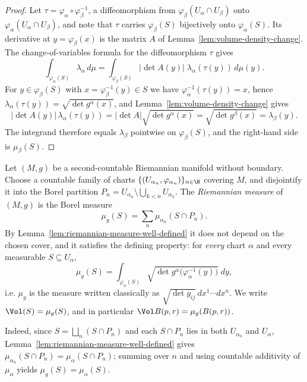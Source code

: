 \begin{proof}
\sketch
{}
\leanok
Let $\tau=\varphi_\alpha\circ\varphi_\beta^{-1}$, a diffeomorphism from
$\varphi_\beta(U_\alpha\cap U_\beta)$ onto $\varphi_\alpha(U_\alpha\cap U_\beta)$, and note
that $\tau$ carries $\varphi_\beta(S)$ bijectively onto $\varphi_\alpha(S)$. Its derivative
at $y=\varphi_\beta(x)$ is the matrix $A$ of Lemma~\ref{lem:volume-density-change}. The
change-of-variables formula for the diffeomorphism $\tau$ gives
$$\int_{\varphi_\alpha(S)}\lambda_\alpha\,d\mu
=\int_{\varphi_\beta(S)}\lvert\det A(y)\rvert\;\lambda_\alpha(\tau(y))\,d\mu(y).$$
For $y\in\varphi_\beta(S)$ with $x=\varphi_\beta^{-1}(y)\in S$ we have
$\varphi_\alpha^{-1}(\tau(y))=x$, hence
$\lambda_\alpha(\tau(y))=\sqrt{\det g^\alpha(x)}$, and Lemma~\ref{lem:volume-density-change}
gives
$$\lvert\det A(y)\rvert\,\lambda_\alpha(\tau(y))
=\lvert\det A\rvert\sqrt{\det g^\alpha(x)}=\sqrt{\det g^\beta(x)}=\lambda_\beta(y).$$
The integrand therefore equals $\lambda_\beta$ pointwise on $\varphi_\beta(S)$, and the
right-hand side is $\mu_\beta(S)$.
\end{proof}

\begin{definition}
\label{def:riemannian-measure}
\leanok



Let $(M,g)$ be a second-countable Riemannian manifold without boundary. Choose a countable
family of charts $\{(U_{\alpha_n},\varphi_{\alpha_n})\}_{n\in\N}$ covering $M$, and
disjointify it into the Borel partition
$P_n=U_{\alpha_n}\setminus\bigcup_{k<n}U_{\alpha_k}$. The \emph{Riemannian measure} of
$(M,g)$ is the Borel measure
$$\mu_g(S)=\sum_{n}\mu_{\alpha_n}(S\cap P_n).$$
By Lemma~\ref{lem:riemannian-measure-well-defined} it does not depend on the chosen cover, and
it satisfies the defining property: for \emph{every} chart $\alpha$ and every measurable
$S\subseteq U_\alpha$,
$$\mu_g(S)=\int_{\varphi_\alpha(S)}\sqrt{\det g^\alpha\bigl(\varphi_\alpha^{-1}(y)\bigr)}\;dy,$$
i.e. $\mu_g$ is the measure written classically as $\sqrt{\det g_{ij}}\,dx^1\cdots dx^n$. We
write $\Vol(S)=\mu_g(S)$, and in particular $\Vol B(p,r)=\mu_g(B(p,r))$.

Indeed, since $S=\bigsqcup_n (S\cap P_n)$ and each $S\cap P_n$ lies in both $U_{\alpha_n}$ and
$U_\alpha$, Lemma~\ref{lem:riemannian-measure-well-defined} gives
$\mu_{\alpha_n}(S\cap P_n)=\mu_\alpha(S\cap P_n)$; summing over $n$ and using countable
additivity of $\mu_\alpha$ yields $\mu_g(S)=\mu_\alpha(S)$.
\end{definition}

